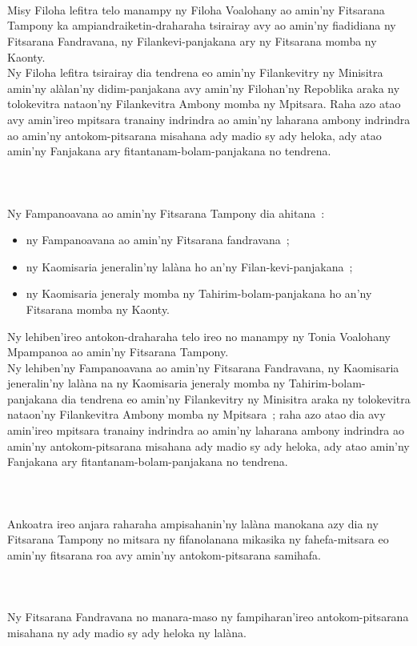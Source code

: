 \documentclass[12pt]{article}
\newcounter{laharana}
\newcommand{\andininy}[0]{
  \paragraph{%
    \NoCaseChange{%
      Andininy~\addtocounter{laharana}{1}\thelaharana.}\label{and:\thelaharana}~%
  }%
}
\begin{document}
\andininy{}Misy Filoha lefitra telo manampy ny Filoha Voalohany ao amin'ny
Fitsarana Tampony ka ampiandraiketin-draharaha tsirairay avy ao amin'ny
fiadidiana ny Fitsarana Fandravana, ny Filankevi-panjakana ary ny Fitsarana
momba ny Kaonty.\\

\noindent
Ny Filoha lefitra tsirairay dia tendrena eo amin'ny Filankevitry ny Minisitra
amin'ny alàlan'ny didim-panjakana avy amin'ny Filohan'ny Repoblika araka ny
tolokevitra nataon'ny Filankevitra Ambony momba ny Mpitsara. Raha azo atao avy
amin'ireo mpitsara tranainy indrindra ao amin'ny laharana ambony indrindra ao
amin'ny antokom-pitsarana misahana ady madio sy ady heloka, ady atao amin'ny
Fanjakana ary fitantanam-bolam-panjakana no tendrena.

\andininy{}Ny Fampanoavana ao amin'ny Fitsarana Tampony dia ahitana~:

\begin{itemize}
\item ny Fampanoavana ao amin'ny Fitsarana fandravana~;

\item ny Kaomisaria jeneralin'ny lalàna ho an'ny Filan-kevi-panjakana~;

\item ny Kaomisaria jeneraly momba ny Tahirim-bolam-panjakana ho an'ny Fitsarana
  momba ny Kaonty.
\end{itemize}

Ny lehiben'ireo antokon-draharaha telo ireo no manampy ny Tonia Voalohany
Mpampanoa ao amin'ny Fitsarana Tampony.
\\

\noindent
Ny lehiben'ny Fampanoavana ao amin'ny Fitsarana Fandravana, ny Kaomisaria
jeneralin'ny lalàna na ny Kaomisaria jeneraly momba ny Tahirim-bolam-panjakana
dia tendrena eo amin'ny Filankevitry ny Minisitra araka ny tolokevitra nataon'ny
Filankevitra Ambony momba ny Mpitsara~; raha azo atao dia avy amin'ireo mpitsara
tranainy indrindra ao amin'ny laharana ambony indrindra ao amin'ny
antokom-pitsarana misahana ady madio sy ady heloka, ady atao amin'ny Fanjakana
ary fitantanam-bolam-panjakana no tendrena.

\andininy{}Ankoatra ireo anjara raharaha ampisahanin'ny lalàna manokana azy
dia ny Fitsarana Tampony no mitsara ny fifanolanana mikasika ny fahefa-mitsara
eo amin'ny fitsarana roa avy amin'ny antokom-pitsarana samihafa.

\andininy{}Ny Fitsarana Fandravana no manara-maso ny fampiharan'ireo
antokom-pitsarana misahana ny ady madio sy ady heloka ny lalàna.\\
\end{document}

